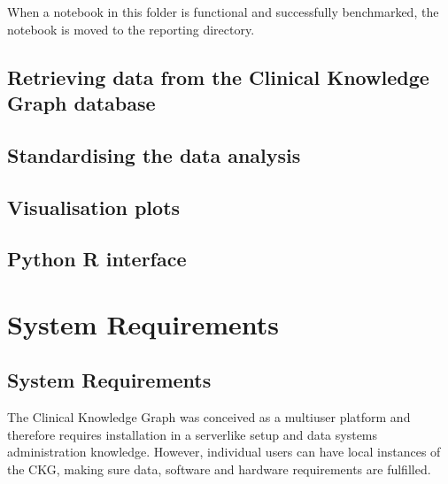 \documentclass[letterpaper,10pt,english]{sphinxmanual}
\begin{document}
When a notebook in this folder is functional and successfully benchmarked, the notebook is moved to the reporting directory.


\section{Retrieving data from the Clinical Knowledge Graph database}
\label{\detokenize{advanced_features/ckg-queries:retrieving-data-from-the-clinical-knowledge-graph-database}}\label{\detokenize{advanced_features/ckg-queries::doc}}

\section{Standardising the data analysis}
\label{\detokenize{advanced_features/standard-analysis:standardising-the-data-analysis}}\label{\detokenize{advanced_features/standard-analysis::doc}}

\section{Visualisation plots}
\label{\detokenize{advanced_features/visualization-plots:visualisation-plots}}\label{\detokenize{advanced_features/visualization-plots::doc}}

\section{Python \sphinxhyphen{} R interface}
\label{\detokenize{advanced_features/R-interface:python-r-interface}}\label{\detokenize{advanced_features/R-interface::doc}}

\chapter{System Requirements}
\label{\detokenize{index:system-requirements}}

\section{System Requirements}
\label{\detokenize{system_requirements:system-requirements}}\label{\detokenize{system_requirements::doc}}
The Clinical Knowledge Graph was conceived as a multi\sphinxhyphen{}user platform and therefore requires installation in a server\sphinxhyphen{}like setup and data systems administration knowledge. However, individual users can have local instances of the CKG, making sure data, software and hardware requirements are fulfilled.
\end{document}
